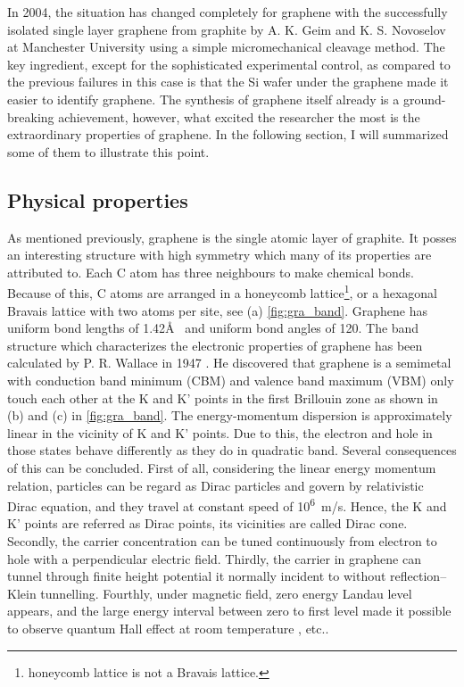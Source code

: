 In 2004, the situation has changed completely for graphene with the successfully isolated single layer graphene from graphite by A. K. Geim and K. S. Novoselov at Manchester University using a simple micromechanical cleavage method. The key ingredient, except for the sophisticated experimental control, as compared to the previous failures\cite{Krishnan1997,Ohashi1997} in this case is that the Si wafer under the graphene made it easier to identify graphene\cite{Geim2007}. The synthesis of graphene itself already is a ground-breaking achievement, however, what excited the researcher the most is the extraordinary properties of graphene. In the following section, I will summarized some of them to illustrate this point.

\subsection{Physical properties}

As mentioned previously, graphene is the single atomic layer of graphite. It posses an interesting structure with high symmetry which many of its properties are attributed to. Each C atom has three neighbours to make chemical bonds. Because of this, C atoms are arranged in a honeycomb lattice\footnote{honeycomb lattice is not a Bravais lattice.}, or a hexagonal Bravais lattice with two atoms per site, see (a) \autoref{fig:gra_band}. Graphene has uniform bond lengths of 1.42\AA~ and uniform bond angles of 120\textdegree. The band structure which characterizes the electronic properties of graphene has been calculated by P. R. Wallace in 1947 \cite{Wallace1947}. He discovered that graphene is a semimetal with conduction band minimum (CBM) and valence band maximum (VBM) only touch each other at the K and K' points in the first Brillouin zone as shown in (b) and (c) in \autoref{fig:gra_band}. The energy-momentum dispersion is approximately linear in the vicinity of K and K' points. Due to this, the electron and hole in those states behave differently as they do in quadratic band. Several consequences of this can be concluded. First of all, considering the linear energy momentum relation, particles can be regard as Dirac particles and govern by relativistic Dirac equation\cite{Novoselov2005}, and they travel at constant speed of \si{10^6m/s}. Hence, the K and K' points are referred as Dirac points, its vicinities are called Dirac cone. Secondly, the carrier concentration can be tuned continuously from electron to hole with a perpendicular electric field\cite{Geim2007}. Thirdly, the carrier in graphene can tunnel through finite height potential it normally incident to without reflection--Klein tunnelling\cite{Katsnelson2006}. Fourthly, under magnetic field, zero energy Landau level appears, and the large energy interval between zero to first level made it possible to observe quantum Hall effect at room temperature \cite{Novoselov1379}, etc..

